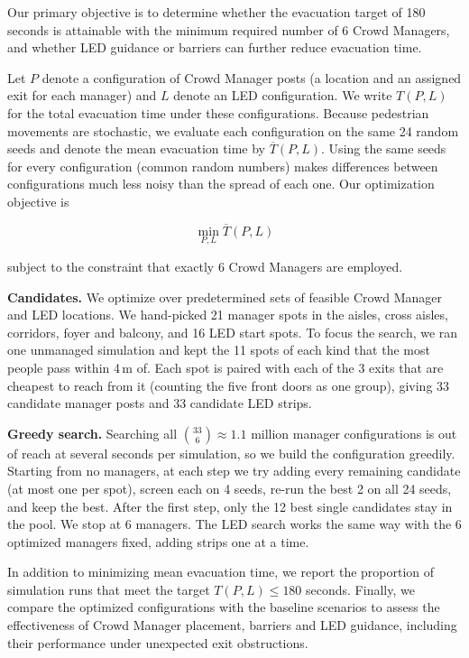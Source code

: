 \documentclass{article}
\begin{document}
Our primary objective is to determine whether the evacuation
target of 180 seconds is attainable with the minimum required
number of 6 Crowd Managers, and whether LED guidance or barriers can further reduce evacuation time.

Let $P$ denote a configuration of Crowd Manager posts (a location and an assigned exit for each manager)
and $L$ denote an LED configuration. We write
$T(P,L)$ for the total evacuation time under these
configurations. Because pedestrian movements are stochastic, we evaluate
each configuration on the same 24 random seeds and denote
the mean evacuation time by $\overline{T}(P,L)$. Using the same seeds for every configuration (common random numbers) makes differences between configurations much less noisy than the spread of each one. Our optimization objective is

\begin{equation}
    \boxed{
    \min_{P,L} \overline{T}(P,L)
    }
\end{equation}

subject to the constraint that exactly 6 Crowd Managers
are employed.

\textbf{Candidates.} We optimize over predetermined sets of feasible Crowd Manager and LED locations. We hand-picked 21 manager spots in the aisles, cross aisles, corridors, foyer and balcony, and 16 LED start spots. To focus the search, we ran one unmanaged simulation and kept the 11 spots of each kind that the most people pass within 4\,m of. Each spot is paired with each of the 3 exits that are cheapest to reach from it (counting the five front doors as one group), giving 33 candidate manager posts and 33 candidate LED strips.

\textbf{Greedy search.} Searching all $\binom{33}{6}\approx 1.1$ million manager configurations is out of reach at several seconds per simulation, so we build the configuration greedily. Starting from no managers, at each step we try adding every remaining candidate (at most one per spot), screen each on 4 seeds, re-run the best 2 on all 24 seeds, and keep the best. After the first step, only the 12 best single candidates stay in the pool. We stop at 6 managers. The LED search works the same way with the 6 optimized managers fixed, adding strips one at a time.

In addition to minimizing mean evacuation time, we report the proportion of simulation
runs that meet the target
$T(P,L) \leq 180$ seconds.
Finally, we compare the optimized configurations with the
baseline scenarios to assess the effectiveness of Crowd
Manager placement, barriers and LED guidance, including their
performance under unexpected exit obstructions.
\end{document}
